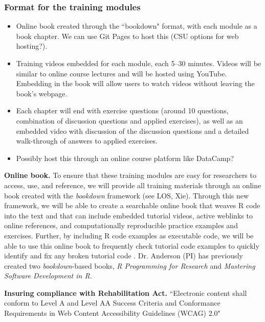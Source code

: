 \documentclass[pdftex,english,11pt,parskip=half]{scrartcl}
\begin{document}






\subsubsection*{Format for the training modules}

\begin{itemize}
\item Online book created through the ``bookdown" format, with each module as a book chapter. We can use Git Pages to host this (CSU options for web hosting?).
\item Training videos embedded for each module, each 5--30 minutes. Videos will be similar to online course lectures and will be hosted using YouTube. Embedding in the book will allow users to watch videos without leaving the book's webpage. 
\item Each chapter will end with exercise questions (around 10 questions, combination of discussion questions and applied exercises), as well as an embedded video with discussion of the discussion questions and a detailed walk-through of answers to applied exercises. 
\item Possibly host this through an online course platform like DataCamp?
\end{itemize}

\textbf{Online book.} To ensure that these training modules are easy for researchers to access, use, and reference, we will provide all training materials through an online book created with the \textit{bookdown} framework \cite{xie2016bookdown} (see LOS, Xie). Through this new framework, we will be able to create a searchable online book that weaves R code into the text and that can include embedded tutorial videos, active weblinks to online references, and computationally reproducible practice examples and exercises. Further, by including R code examples as executable code, we will be able to use this online book to frequently check tutorial code examples to quickly identify and fix any broken tutorial code \cite{xie2016bookdown}.  Dr. Anderson (PI) has previously created two \textit{bookdown}-based books, \textit{R Programming for Research} and \textit{Mastering Software Development in R}.  

\noindent \textbf{Insuring compliance with Rehabilitation Act.} ``Electronic content shall conform to Level A and Level AA Success Criteria and Conformance Requirements in Web Content Accessibility Guidelines (WCAG) 2.0"
\end{document}
